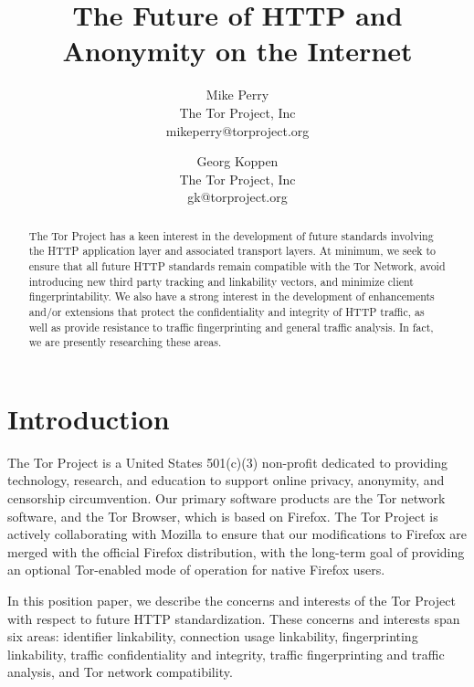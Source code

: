 \documentclass[letterpaper,11pt]{llncs}
\begin{document}
\title{The Future of HTTP and Anonymity on the Internet}

\author{Mike Perry \\ The Tor Project, Inc \\ mikeperry@torproject.org \and Georg Koppen \\ The Tor Project, Inc \\ gk@torproject.org}


\maketitle
\pagestyle{plain}

\begin{abstract}

The Tor Project has a keen interest in the development of future standards
involving the HTTP application layer and associated transport layers. At
minimum, we seek to ensure that all future HTTP standards remain compatible
with the Tor Network, avoid introducing new third party tracking and
linkability vectors, and minimize client fingerprintability. We also have a
strong interest in the development of enhancements and/or extensions that
protect the confidentiality and integrity of HTTP traffic, as well as provide
resistance to traffic fingerprinting and general traffic analysis. In fact, we
are presently researching these areas.

\end{abstract}

\section{Introduction}

The Tor Project is a United States 501(c)(3) non-profit dedicated to providing
technology, research, and education to support online privacy, anonymity, and
censorship circumvention. Our primary software products are the Tor network
software, and the Tor Browser, which is based on Firefox. The Tor Project is
actively collaborating with Mozilla to ensure that our modifications to
Firefox are merged with the official Firefox distribution, with the long-term
goal of providing an optional Tor-enabled mode of operation for native Firefox
users.

In this position paper, we describe the concerns and interests of the Tor
Project with respect to future HTTP standardization. These concerns and
interests span six areas: identifier linkability, connection usage linkability,
fingerprinting linkability, traffic confidentiality and integrity, traffic
fingerprinting and traffic analysis, and Tor network compatibility.
\end{document}
